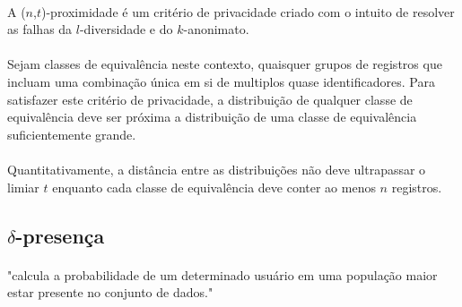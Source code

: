 \paragraph{} A ($n$,$t$)-proximidade\cite{tproximity} é um critério de privacidade criado com o intuito de resolver as falhas da $l$-diversidade e do $k$-anonimato.

\paragraph{} Sejam classes de equivalência neste contexto, quaisquer grupos de registros que incluam uma combinação única em si de multiplos quase identificadores. Para satisfazer este critério de privacidade, a distribuição de qualquer classe de equivalência deve ser próxima a distribuição de uma classe de equivalência suficientemente grande.

\paragraph{} Quantitativamente, a distância entre as distribuições não deve ultrapassar o limiar $t$ enquanto cada classe de equivalência deve conter ao menos $n$ registros.

\subsection{$\delta$-presença}

\paragraph{} "calcula a probabilidade de um determinado usuário em uma população maior estar presente no conjunto de dados."




